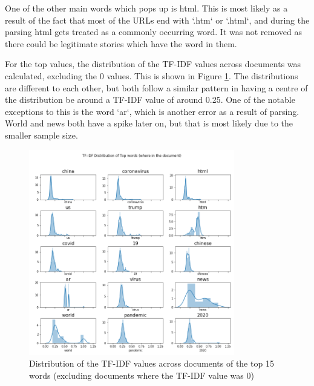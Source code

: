 One of the other main words which pops up is html. This is most likely as a result of the fact that most of the URLs end with `.htm` or `.html`, and during the parsing html gets treated as a commonly occurring word. It was not removed as there could be legitimate stories which have the word in them. 

For the top values, the distribution of the TF-IDF values across documents was calculated, excluding the 0 values. This is shown in Figure \ref{fig:tfidfdist}. The distributions are different to each other, but both follow a similar pattern in having a centre of the distribution be around a TF-IDF value of around 0.25. One of the notable exceptions to this is the word `ar`, which is another error as a result of parsing. World and news both have a spike later on, but that is most likely due to the smaller sample size.

\begin{figure}[H]
	\centering
	\includegraphics[width=0.8\textwidth]{Images/usa_tfidf_top_distribution.png}
	\caption{Distribution of the TF-IDF values across documents of the top 15 words (excluding documents where the TF-IDF value was 0)}
	\label{fig:tfidfdist}
\end{figure}

